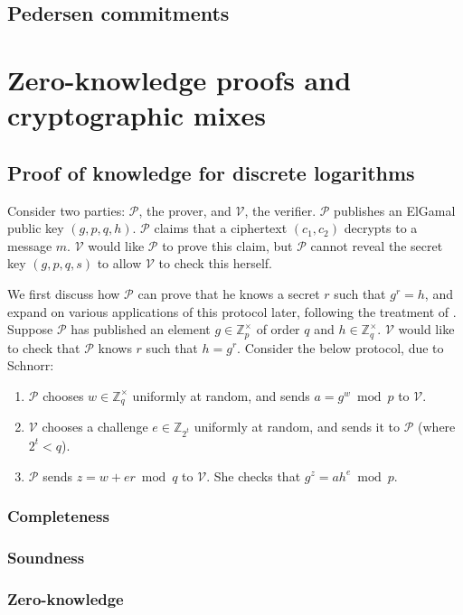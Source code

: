 \documentclass[12pt,a4paper]{article}
\theoremstyle{definition}
\begin{document}
\subsection{Pedersen commitments}
\newpage
\section{Zero-knowledge proofs and cryptographic mixes}\label{app-proof}
\subsection{Proof of knowledge for discrete logarithms}
Consider two parties: $\mathcal{P}$, the prover, and $\mathcal{V}$, the verifier. $\mathcal{P}$ publishes an ElGamal public key $(g,p,q,h)$. $\mathcal{P}$ claims that a ciphertext $(c_1, c_2)$ decrypts to a message $m$. $\mathcal{V}$ would like $\mathcal{P}$ to prove this claim, but $\mathcal{P}$ cannot reveal the secret key $(g,p,q,s)$ to allow $\mathcal{V}$ to check this herself.

We first discuss how $\mathcal{P}$ can prove that he knows a secret $r$ such that $g^r=h$, and expand on various applications of this protocol later, following the treatment of \cite{damgaard2002sigma}. Suppose $\mathcal{P}$ has published an element $g\in\mathbb{Z}^\times_p$ of order $q$ and $h\in\mathbb{Z}^\times_q$. $\mathcal{V}$ would like to check that $\mathcal{P}$ knows $r$ such that $h=g^r$. Consider the below protocol, due to Schnorr:
\begin{enumerate}
    \item $\mathcal{P}$ chooses $w\in\mathbb{Z}^\times_q$ uniformly at random, and sends $a=g^w\bmod p$ to $\mathcal{V}$.
    \item $\mathcal{V}$ chooses a challenge $e\in\mathbb{Z}_{2^t}$ uniformly at random, and sends it to $\mathcal{P}$ (where $2^t<q$).
    \item $\mathcal{P}$ sends $z=w+er\bmod q$ to $\mathcal{V}$. She checks that $g^z=ah^e\bmod p$.
\end{enumerate}
\subsubsection{Completeness}
\subsubsection{Soundness}
\subsubsection{Zero-knowledge}
\end{document}
